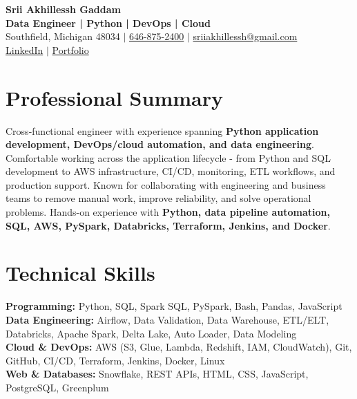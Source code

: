 \documentclass[letterpaper,10pt]{article}
\begin{document}
\fontsize{9.35pt}{10.45pt}\selectfont

\begin{center}
    {\LARGE \textbf{Srii Akhillessh Gaddam}} \\[-1pt]
    \textbf{Data Engineer | Python | DevOps | Cloud} \\[2pt]
    Southfield, Michigan 48034 $|$
    \href{tel:6468752400}{646-875-2400} $|$
    \href{mailto:sriiakhillessh@gmail.com}{sriiakhillessh@gmail.com} \\[1pt]
    \href{https://www.linkedin.com/in/srii-akhiilessh-gaddam-b48668191/}{LinkedIn} $|$
    \href{https://sriiakhillesshg.github.io/portfolio/}{Portfolio}
\end{center}
\vspace{-8pt}

\section{Professional Summary}
\small{Cross-functional engineer with experience spanning \textbf{Python application development, DevOps/cloud automation, and data engineering}. Comfortable working across the application lifecycle - from Python and SQL development to AWS infrastructure, CI/CD, monitoring, ETL workflows, and production support. Known for collaborating with engineering and business teams to remove manual work, improve reliability, and solve operational problems. Hands-on experience with \textbf{Python, data pipeline automation, SQL, AWS, PySpark, Databricks, Terraform, Jenkins, and Docker}.}

\section{Technical Skills}
\small{
\textbf{Programming:} Python, SQL, Spark SQL, PySpark, Bash, Pandas, JavaScript \\
\textbf{Data Engineering:} Airflow, Data Validation, Data Warehouse, ETL/ELT, Databricks, Apache Spark, Delta Lake, Auto Loader, Data Modeling \\
\textbf{Cloud \& DevOps:} AWS (S3, Glue, Lambda, Redshift, IAM, CloudWatch), Git, GitHub, CI/CD, Terraform, Jenkins, Docker, Linux \\
\textbf{Web \& Databases:} Snowflake, REST APIs, HTML, CSS, JavaScript, PostgreSQL, Greenplum
}
\end{document}
